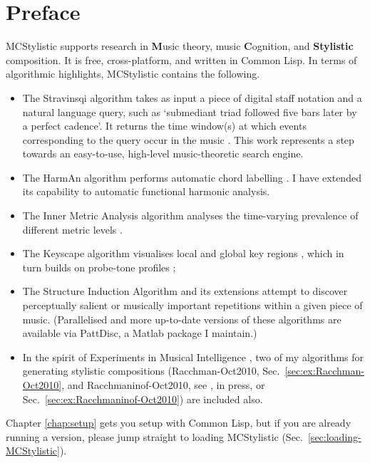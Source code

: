 \chapter*{Preface}\label{chap:preface}

MCStylistic supports research in \textbf{M}usic theory, music \textbf{C}ognition, and \textbf{Stylistic} composition. It is free, cross-platform, and written in Common Lisp. In terms of algorithmic highlights, MCStylistic contains the following.
\begin{itemize}
\item The Stravinsqi algorithm takes as input a piece of digital staff notation and a natural language query, such as `submediant triad followed five bars later by a perfect cadence'. It returns the time window(s) at which events corresponding to the query occur in the music \citep*{collins2014}. This work represents a step towards an easy-to-use, high-level music-theoretic search engine.
\item The HarmAn algorithm performs automatic chord labelling \citep*{pardo2002}. I have extended its capability to automatic functional harmonic analysis.
\item The Inner Metric Analysis algorithm analyses the time-varying prevalence of different metric levels \citep*{volk2008}.
\item The Keyscape algorithm visualises local and global key regions \citep*{sapp2005}, which in turn builds on probe-tone profiles \citep*{krumhansl1990,aarden2003};
\item The Structure Induction Algorithm \citep*[SIA,][]{meredith2002,meredith2003,meredith2006b} and its extensions \citep{collins2010b,collins2011a,collins2011b} attempt to discover perceptually salient or musically important repetitions within a given piece of music. (Parallelised and more up-to-date versions of these algorithms are available via PattDisc, a Matlab package I maintain.)
\item In the spirit of Experiments in Musical Intelligence \citep*[EMI,][]{cope1996,cope2001,cope2005}, two of my algorithms for generating stylistic compositions (Racchman-Oct2010, Sec.~\ref{sec:ex:Racchman-Oct2010}, and Racchmaninof-Oct2010, see \citeauthor{collins2015}, in press, or Sec.~\ref{sec:ex:Racchmaninof-Oct2010}) are included also.
\end{itemize}

Chapter \ref{chap:setup} gets you setup with Common Lisp, but if you are already running a version, please jump straight to loading MCStylistic (Sec.~\ref{sec:loading-MCStylistic}).

